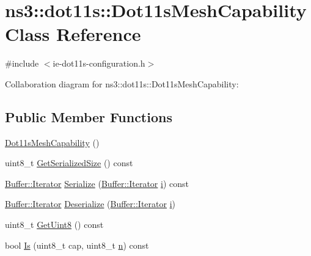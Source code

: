 \hypertarget{classns3_1_1dot11s_1_1Dot11sMeshCapability}{}\section{ns3\+:\+:dot11s\+:\+:Dot11s\+Mesh\+Capability Class Reference}
\label{classns3_1_1dot11s_1_1Dot11sMeshCapability}


{\ttfamily \#include $<$ie-\/dot11s-\/configuration.\+h$>$}



Collaboration diagram for ns3\+:\+:dot11s\+:\+:Dot11s\+Mesh\+Capability\+:
\subsection*{Public Member Functions}
\begin{DoxyCompactItemize}
\item 
\hyperlink{classns3_1_1dot11s_1_1Dot11sMeshCapability_a81e0485a9c64c6e3451754087588a8be}{Dot11s\+Mesh\+Capability} ()
\item 
uint8\+\_\+t \hyperlink{classns3_1_1dot11s_1_1Dot11sMeshCapability_ae6ccd0a481e48ba7db5a2184ed93d374}{Get\+Serialized\+Size} () const 
\item 
\hyperlink{classns3_1_1Buffer_1_1Iterator}{Buffer\+::\+Iterator} \hyperlink{classns3_1_1dot11s_1_1Dot11sMeshCapability_acc9e98ffbdf6ec123fd52ac8c60c24fe}{Serialize} (\hyperlink{classns3_1_1Buffer_1_1Iterator}{Buffer\+::\+Iterator} \hyperlink{lte__uplink__power__control_8m_a6f6ccfcf58b31cb6412107d9d5281426}{i}) const 
\item 
\hyperlink{classns3_1_1Buffer_1_1Iterator}{Buffer\+::\+Iterator} \hyperlink{classns3_1_1dot11s_1_1Dot11sMeshCapability_ae384fc4d77bb7dbd00977fbfb3d8b9ec}{Deserialize} (\hyperlink{classns3_1_1Buffer_1_1Iterator}{Buffer\+::\+Iterator} \hyperlink{lte__uplink__power__control_8m_a6f6ccfcf58b31cb6412107d9d5281426}{i})
\item 
uint8\+\_\+t \hyperlink{classns3_1_1dot11s_1_1Dot11sMeshCapability_ad188791377b17e0ab114cc1670e837e4}{Get\+Uint8} () const 
\item 
bool \hyperlink{classns3_1_1dot11s_1_1Dot11sMeshCapability_aa136f8ab19ee7256285725d26d43bf64}{Is} (uint8\+\_\+t cap, uint8\+\_\+t \hyperlink{lte__link__budget__x2__handover__measures_8m_abdb05bc5a064cf642a06c83b3392f148}{n}) const 
\end{DoxyCompactItemize}
